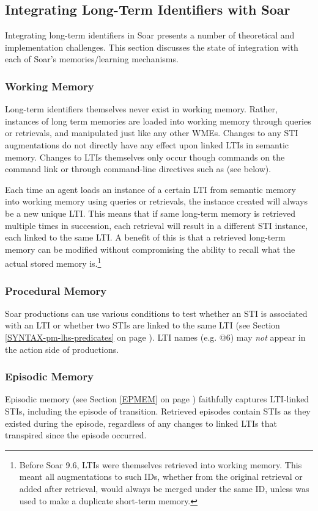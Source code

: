 \subsection{Integrating Long-Term Identifiers with Soar}
Integrating long-term identifiers in Soar presents a number of theoretical and implementation challenges.  
This section discusses the state of integration with each of Soar's memories/learning mechanisms.

\subsubsection{Working Memory}
Long-term identifiers themselves never exist in working memory. Rather, instances of long term memories are loaded into working memory through queries or retrievals, and manipulated just like any other WMEs. Changes to any STI augmentations do not directly have any effect upon linked LTIs in semantic memory. Changes to LTIs themselves only occur though  commands on the command link  or through command-line directives such as  (see below).

Each time an agent loads an instance of a certain LTI from semantic memory into working memory using queries or retrievals, the instance created will always be a new unique LTI. This means that if same long-term memory is retrieved multiple times in succession, each retrieval will result in a different STI instance, each linked to the same LTI. A benefit of this is that a retrieved long-term memory can be modified without compromising the ability to recall what the actual stored memory is.\footnote{
	Before Soar 9.6, LTIs were themselves retrieved into working memory. This meant all augmentations to such IDs, whether from the original retrieval or added after retrieval, would always be merged under the same ID, unless  was used to make a duplicate short-term memory.}

\subsubsection{Procedural Memory}
Soar productions can use various conditions to test whether an STI is associated with an LTI or whether two STIs are linked to the same LTI (see Section \ref{SYNTAX-pm-lhs-predicates} on page \pageref{SYNTAX-pm-lhs-predicates}).
LTI names (e.g. {@}6) may \emph{not} appear in the action side of productions.

\subsubsection{Episodic Memory}
Episodic memory (see Section \ref{EPMEM} on page \pageref{EPMEM}) faithfully captures LTI-linked STIs, including the episode of transition. 
Retrieved episodes contain STIs as they existed during the episode, regardless of any changes to linked LTIs that transpired since the episode occurred.

